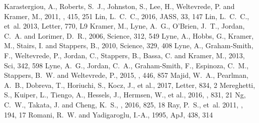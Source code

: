 \documentclass[12pt,preprint]{aastex}
\begin{document}
\begin{thebibliography}{}
  {Karastergiou}, A., {Roberts}, S.~J., {Johnston}, S.,
  {Lee}, H., {Weltevrede}, P. and {Kramer}, M., 2011, \mnras, 415, 251
 {Lin}, L.~C.~C., 2016, JASS, 33, 147
  {Lin}, L.~C.~C., {et~al.} 2013, \apj Letter, 770, L9
  {Kramer}, M., {Lyne}, A.~G., {O'Brien}, J.~T., {Jordan}, C.~A. and
  {Lorimer}, D.~R., 2006, Science, 312, 549
  {Lyne}, A., {Hobbs}, G., {Kramer}, M., {Stairs}, I. and
  {Stappers}, B., 2010, Science, 329, 408
  {Lyne}, A., {Graham-Smith}, F., {Weltevrede}, P., {Jordan}, C.,
  {Stappers}, B., {Bassa}, C. and {Kramer}, M., 2013, Sci, 342, 598
  {Lyne}, A.~G., {Jordan}, C.~A., {Graham-Smith}, F.,
  {Espinoza}, C.~M., {Stappers}, B.~W. and {Weltevrede}, P., 2015, \mnras, 446, 857
  {Majid}, W.~A., {Pearlman}, A.~B., {Dobreva}, T., {Horiuchi}, S.,  {Kocz}, J.,
  et al., 2017, \apj Letter, 834, 2
  {Mereghetti}, S., {Kuiper}, L., {Tiengo}, A., {Hessels}, J.,
  {Hermsen}, W., et al., 2016, \apj, 831, 21
  {Ng}, C.~W., {Takata}, J. and {Cheng}, K.~S., \apj, 2016, 825, 18
  {Ray}, P.~S., {et~al.} 2011, \apjs, 194, 17
  {Romani}, R.~W. and {Yadigaroglu}, I.-A., 1995, ApJ, 438, 314


\end{thebibliography}
\end{document}
